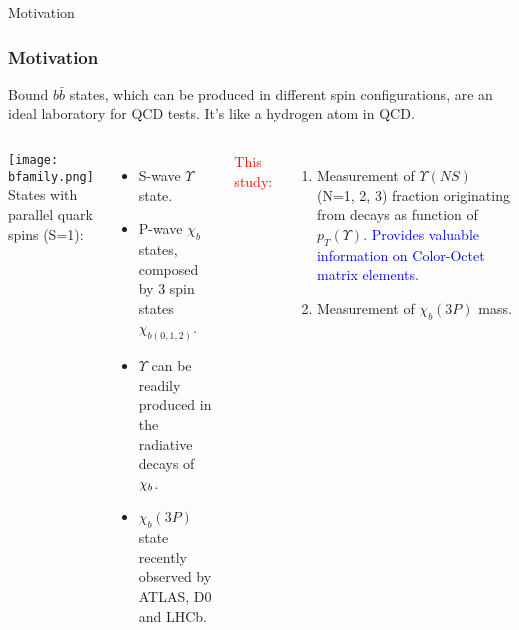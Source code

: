\begin{frame}{Motivation}

\frametitle{Motivation}
Bound $b\bar{b}$ states, which can be produced in different spin
configurations, are an ideal laboratory for QCD tests. It's like a hydrogen
atom in QCD.
\begin{columns}[c]
\texttt{[image: bfamily.png]}
\fontsize{9pt}{7.2}\selectfont
States with parallel quark spins (S=1):
\begin{itemize}
  \item S-wave $\Upsilon$ state.
  \item P-wave $\chi_{b}$ states, composed by 3 spin states $\chi_{b(0,1,2)}$. 
  \item $\Upsilon$ can be readily produced in the radiative decays of $\chi_{b}$.
  \item $\chi_{b}(3P)$ state recently observed by ATLAS, D0 and LHCb.
\end{itemize}

\textcolor{red}{This study:}
\begin{enumerate}
  \item Measurement of  $\Upsilon(NS)$ (N=1, 2, 3) fraction  originating from \chib decays as function of $p_T(\Upsilon)$.
  \textcolor{blue}{Provides valuable information on Color-Octet matrix elements.}
  \item Measurement of $\chi_{b}(3P)$ mass.
\end{enumerate}

\end{columns}

\end{frame}
